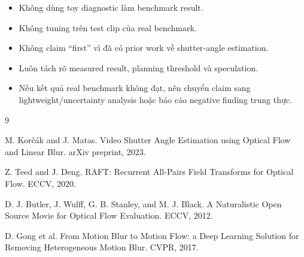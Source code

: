 \documentclass[11pt,a4paper]{article}
\begin{document}
\begin{itemize}[leftmargin=1.5em]
    \item Không dùng toy diagnostic làm benchmark result.
    \item Không tuning trên test clip của real benchmark.
    \item Không claim ``first'' vì đã có prior work về shutter-angle estimation.
    \item Luôn tách rõ measured result, planning threshold và speculation.
    \item Nếu kết quả real benchmark không đạt, nên chuyển claim sang lightweight/uncertainty analysis hoặc báo cáo negative finding trung thực.
\end{itemize}

\begin{thebibliography}{9}

M. Korčák and J. Matas.
\newblock Video Shutter Angle Estimation using Optical Flow and Linear Blur.
\newblock arXiv preprint, 2023.

Z. Teed and J. Deng.
\newblock RAFT: Recurrent All-Pairs Field Transforms for Optical Flow.
\newblock ECCV, 2020.

D. J. Butler, J. Wulff, G. B. Stanley, and M. J. Black.
\newblock A Naturalistic Open Source Movie for Optical Flow Evaluation.
\newblock ECCV, 2012.

D. Gong et al.
\newblock From Motion Blur to Motion Flow: a Deep Learning Solution for Removing Heterogeneous Motion Blur.
\newblock CVPR, 2017.

\end{thebibliography}
\end{document}
